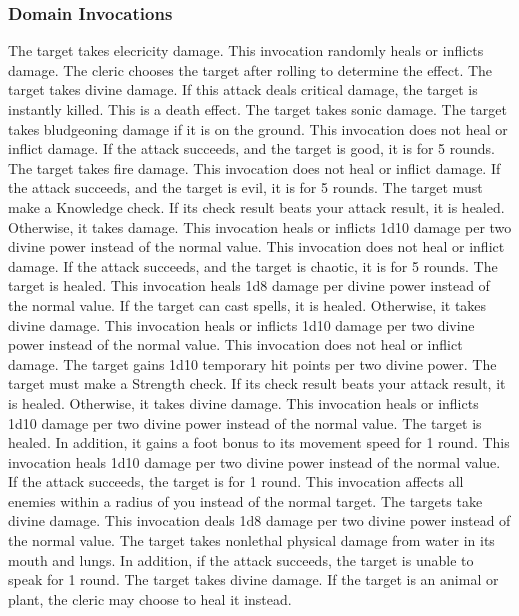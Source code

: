 \subsubsection{Domain Invocations}\label{Domain Invocations}

The target takes elecricity damage.
This invocation randomly heals or inflicts damage.
The cleric chooses the target after rolling to determine the effect.
The target takes divine damage.
If this attack deals critical damage, the target is instantly killed.
This is a death effect.
The target takes sonic damage.
The target takes bludgeoning damage if it is on the ground.
This invocation does not heal or inflict damage.
If the attack succeeds, and the target is good, it is \staggered for 5 rounds.
The target takes fire damage.
This invocation does not heal or inflict damage.
If the attack succeeds, and the target is evil, it is \dazed for 5 rounds.
The target must make a Knowledge check.
If its check result beats your attack result, it is healed.
Otherwise, it takes damage.
This invocation heals or inflicts 1d10 damage per two divine power instead of the normal value.
This invocation does not heal or inflict damage.
If the attack succeeds, and the target is chaotic, it is \immobilized for 5 rounds.
The target is healed.
This invocation heals 1d8 damage per divine power instead of the normal value.
If the target can cast spells, it is healed.
Otherwise, it takes divine damage.
This invocation heals or inflicts 1d10 damage per two divine power instead of the normal value.
This invocation does not heal or inflict damage.
The target gains 1d10 temporary hit points per two divine power.
The target must make a Strength check.
If its check result beats your attack result, it is healed.
Otherwise, it takes divine damage.
This invocation heals or inflicts 1d10 damage per two divine power instead of the normal value.
The target is healed.
In addition, it gains a  foot bonus to its movement speed for 1 round.
This invocation heals 1d10 damage per two divine power instead of the normal value.
If the attack succeeds, the target is \disoriented for 1 round.
This invocation affects all enemies within a \areasmall radius of you instead of the normal target.
The targets take divine damage.
This invocation deals 1d8 damage per two divine power instead of the normal value.
The target takes nonlethal physical damage from water in its mouth and lungs.
In addition, if the attack succeeds, the target is unable to speak for 1 round.
The target takes divine damage.
If the target is an animal or plant, the cleric may choose to heal it instead.

